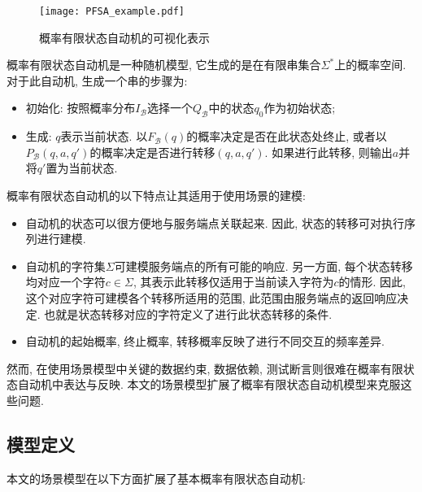             \begin{figure}
                \centering
                \texttt{[image: PFSA\_example.pdf]}
                \caption{概率有限状态自动机的可视化表示}
                \label{fig:PFSA_example}
            \end{figure}
            
            概率有限状态自动机是一种随机模型, 它生成的是在有限串集合$\Sigma^{*}$上的概率空间. 对于此自动机, 生成一个串的步骤为:
            
            \begin{itemize}
                \item 初始化: 按照概率分布$I_\mathcal{B}$选择一个$Q_{\mathcal{B}}$中的状态$q_0$作为初始状态;
                
                \item 生成: $q$表示当前状态. 以$F_{\mathcal{B}}(q)$的概率决定是否在此状态处终止, 或者以$P_{\mathcal{B}}(q, a, q')$的概率决定是否进行转移$(q,a,q')$. 如果进行此转移, 则输出$a$并将$q'$置为当前状态.
            \end{itemize}
        
            概率有限状态自动机的以下特点让其适用于使用场景的建模:
            
            \begin{itemize}
                \item 自动机的状态可以很方便地与服务端点关联起来. 因此, 状态的转移可对执行序列进行建模.
                
                \item 自动机的字符集$\Sigma$可建模服务端点的所有可能的响应. 另一方面, 每个状态转移均对应一个字符$c \in \Sigma$, 其表示此转移仅适用于当前读入字符为$c$的情形. 因此, 这个对应字符可建模各个转移所适用的范围, 此范围由服务端点的返回响应决定. 也就是状态转移对应的字符定义了进行此状态转移的条件.
                
                \item 自动机的起始概率, 终止概率, 转移概率反映了进行不同交互的频率差异.
            \end{itemize}
            
            然而, 在使用场景模型中关键的数据约束, 数据依赖, 测试断言则很难在概率有限状态自动机中表达与反映. 本文的场景模型扩展了概率有限状态自动机模型来克服这些问题.
        
        \subsection{模型定义}
            本文的场景模型在以下方面扩展了基本概率有限状态自动机:
            
